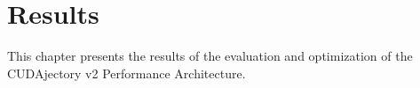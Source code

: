 \chapter{Results}
This chapter presents the results of the evaluation and optimization of the CUDAjectory v2 Performance Architecture.

